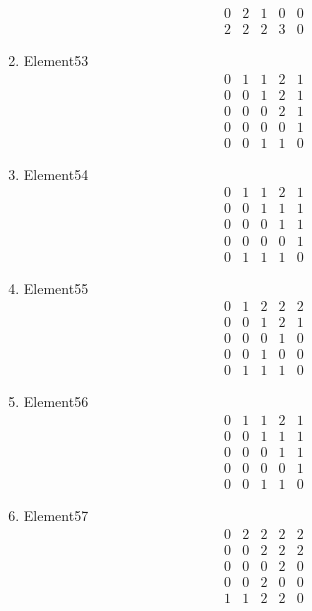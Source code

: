 \documentclass[12pt]{article}
\begin{document}
\begin{multicols}{3}
\begin{enumerate}
\begin{equation*}
\begin{array}{ccccc}
0&2&1&0&0\\
2&2&2&3&0
\end{array}
\end{equation*}
\item Element53
\begin{equation*}
\begin{array}{ccccc}
0&1&1&2&1\\
0&0&1&2&1\\
0&0&0&2&1\\
0&0&0&0&1\\
0&0&1&1&0
\end{array}
\end{equation*}
\item Element54
\begin{equation*}
\begin{array}{ccccc}
0&1&1&2&1\\
0&0&1&1&1\\
0&0&0&1&1\\
0&0&0&0&1\\
0&1&1&1&0
\end{array}
\end{equation*}
\item Element55
\begin{equation*}
\begin{array}{ccccc}
0&1&2&2&2\\
0&0&1&2&1\\
0&0&0&1&0\\
0&0&1&0&0\\
0&1&1&1&0
\end{array}
\end{equation*}
\item Element56
\begin{equation*}
\begin{array}{ccccc}
0&1&1&2&1\\
0&0&1&1&1\\
0&0&0&1&1\\
0&0&0&0&1\\
0&0&1&1&0
\end{array}
\end{equation*}
\item Element57
\begin{equation*}
\begin{array}{ccccc}
0&2&2&2&2\\
0&0&2&2&2\\
0&0&0&2&0\\
0&0&2&0&0\\
1&1&2&2&0
\end{array}

\end{equation*}
\end{enumerate}
\end{multicols}
\end{document}
